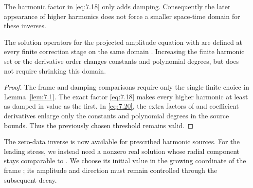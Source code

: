 The harmonic factor in \eqref{eq:7.18} only adds damping. Consequently the
later appearance of higher harmonics does not force a smaller space-time
domain for these inverses.

\begin{corollary}\label{cor:7.3}
The solution operators  for the
projected amplitude equation with  are defined at
every finite correction stage on the same domain
. Increasing the finite harmonic set or the
derivative order changes constants and polynomial degrees, but does not
require shrinking this domain.
\end{corollary}

\begin{proof}
The frame and damping comparisons require only the single finite choice in
Lemma~\ref{lem:7.1}. The exact factor \eqref{eq:7.18} makes every higher
harmonic at least as damped in value as the first. In \eqref{eq:7.20}, the
extra factors of  and coefficient derivatives enlarge
only the constants and polynomial degrees in the source bounds. Thus the
previously chosen threshold  remains valid.
\end{proof}

The zero-data inverse is now available for prescribed harmonic sources. For
the leading stress, we instead need a nonzero real solution whose radial
component stays comparable to . We choose its initial
value in the growing coordinate of the frame ; its
amplitude and direction must remain controlled through the subsequent decay.


